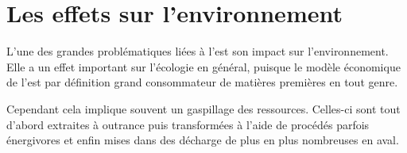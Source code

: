 \section{Les effets sur l’environnement }

\smallbreak L'une des grandes problématiques liées à l'\op est son impact sur l'environnement. Elle a un effet important sur l'écologie en général, puisque le modèle économique de l'\op est par définition grand consommateur de matières premières en tout genre. 

Cependant cela implique souvent un gaspillage des ressources. Celles-ci sont tout d'abord extraites à outrance puis transformées à l'aide de procédés parfois énergivores et enfin mises dans des décharge de plus en plus nombreuses en aval. 
